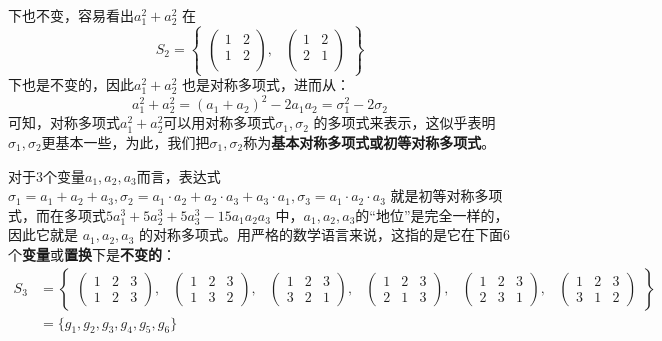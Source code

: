 \documentclass[12pt]{article}
\begin{document}
下也不变，容易看出$a_1^2 + a_2^2$ 在 
$$
S_2 = \begin{Bmatrix}
\begin{pmatrix}
1 & 2 \\
1 & 2 \\
\end{pmatrix}, & \begin{pmatrix}
1 & 2 \\
2 & 1 \\
\end{pmatrix} 
\end{Bmatrix}
$$
下也是不变的，因此$a_1^2 + a_2^2$ 也是对称多项式，进而从：
$$
a_1^2 + a_2^2 = (a_1 + a_2)^2 - 2a_1a_2 =   \sigma_1^2 - 2\sigma_2    
$$
可知，对称多项式$a_1^2 + a_2^2$可以用对称多项式$\sigma_1, \sigma_2$ 的多项式来表示，这似乎表明$\sigma_1, \sigma_2$更基本一些，为此，我们把$\sigma_1, \sigma_2$称为\textbf{基本对称多项式或初等对称多项式}。

对于3个变量$a_1, a_2, a_3$而言，表达式$\sigma_1 = a_1 + a_2 + a_3, \sigma_2 = a_1 \cdot a_2 + a_2 \cdot a_3 + a_3 \cdot a_1, \sigma_3 = a_1 \cdot a_2 \cdot a_3$  就是初等对称多项式，而在多项式$5a_1^3 + 5a_2^3 + 5a_3^3 - 15a_1a_2a_3$ 中，$a_1, a_2, a_3$的“地位”是完全一样的，因此它就是 $a_1, a_2, a_3$ 的对称多项式。用严格的数学语言来说，这指的是它在下面6个\textbf{变量}或\textbf{置换}下是\textbf{不变的}：
\begin{align*}
S_3 &= \begin{Bmatrix}
\begin{pmatrix}
1 & 2 & 3\\
1 & 2 & 3
\end{pmatrix}, & 
\begin{pmatrix}
1 & 2 & 3\\
1 & 3 & 2
\end{pmatrix}, &
\begin{pmatrix}
1 & 2 & 3\\
3 & 2 & 1
\end{pmatrix}, &
\begin{pmatrix}
1 & 2 & 3\\
2 & 1 & 3
\end{pmatrix}, &
\begin{pmatrix}
1 & 2 & 3\\
2 & 3 & 1
\end{pmatrix}, &
\begin{pmatrix}
1 & 2 & 3\\
3 & 1 & 2
\end{pmatrix}
\end{Bmatrix}  \\
&= \{g_1, g_2, g_3, g_4, g_5, g_6\}
\end{align*}
\end{document}
